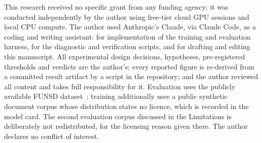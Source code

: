 \documentclass[conference]{IEEEtran}
\begin{document}
This research received no specific grant from any funding agency; it was conducted
independently by the author using free-tier cloud GPU sessions and local CPU compute. The
author used Anthropic's Claude, via Claude Code, as a coding and writing assistant: for
implementation of the training and evaluation harness, for the diagnostic and verification
scripts, and for drafting and editing this manuscript. All experimental design decisions,
hypotheses, pre-registered thresholds and verdicts are the author's; every reported figure is
re-derived from a committed result artifact by a script in the repository; and the author
reviewed all content and takes full responsibility for it. Evaluation uses the publicly
available FUNSD dataset~\cite{funsd}; training additionally uses a public synthetic document
corpus whose distribution states no licence, which is recorded in the model card. The second
evaluation corpus discussed in the Limitations is deliberately not redistributed, for the
licensing reason given there. The author declares no conflict of interest.



\end{document}
